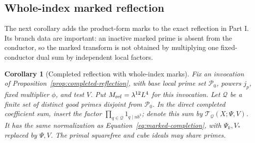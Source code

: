 \documentclass[11pt,a4paper]{article}
\numberwithin{equation}{section}
\numberwithin{figure}{section}
\newtheorem{corollary}[theorem]{Corollary}
\theoremstyle{definition}
\theoremstyle{remark}
\begin{document}
\subsection{Whole-index marked reflection}\label{par:reflection-marks}

The next corollary adds the product-form marks to the exact reflection in
Part I.  Its branch data are important: an inactive marked prime is absent
from the conductor, so the marked transform is not obtained by multiplying
one fixed-conductor dual sum by independent local factors.

\begin{corollary}[Completed reflection with whole-index marks]
\label{cor:marked-reflection}
Fix an invocation of Proposition~\ref{prop:completed-reflection}, with base
local prime set \(\mathcal P_0\), powers \(j_p\), fixed multiplier \(\phi\),
and test \(V\).  Put \(M_{\rm ref}=\lambda^{12}L^4\) for this invocation.
Let \(\mathcal Q\) be a finite set of distinct good primes
disjoint from \(\mathcal P_0\).  In the direct completed coefficient sum,
insert the factor \(\prod_{q\in\mathcal Q}1_{q\mid nb^3}\); denote this sum
by \(\mathcal T_{\mathcal Q}(X;\Psi,V)\).  It has the same normalization as
Equation~\eqref{eq:marked-completion}, with \(\Psi_k,V_*\) replaced by
\(\Psi,V\).  The primal squarefree and cube ideals may share primes.


\end{corollary}
\end{document}
